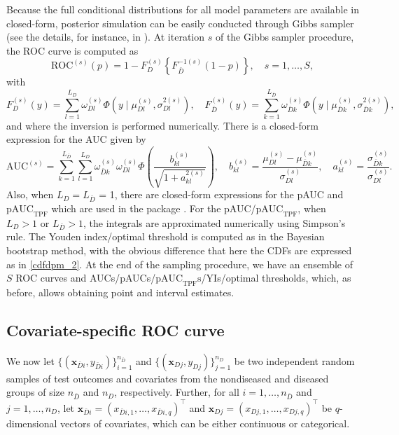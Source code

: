 Because the full conditional distributions for all model parameters are available in closed-form, posterior simulation can be easily conducted through Gibbs sampler (see the details, for instance, in \citealt{Ishwaran2002}). At iteration $s$ of the Gibbs sampler procedure, the ROC curve is computed as
\begin{equation*} 
\text{ROC}^{(s)}(p)=1-F_D^{(s)}\left\{F_{\bar{D}}^{-1(s)}(1-p)\right\},  \quad s=1,\ldots, S,
\end{equation*}
with
\begin{equation} \label{cdfdpm_2} 
F_D^{(s)}(y)=\sum_{l=1}^{L_D}\omega_{Dl}^{(s)}\Phi\left(y\mid\mu_{Dl}^{(s)},\sigma_{Dl}^{2(s)}\right),\quad
F_{\bar{D}}^{(s)}(y)=\sum_{k=1}^{L_{\bar{D}}}\omega_{\bar{D}k}^{(s)}\Phi\left(y\mid\mu_{\bar{D}k}^{(s)},\sigma_{\bar{D}k}^{2(s)}\right),
\end{equation}
and where the inversion is performed numerically. There is a closed-form expression for the AUC \citep{Erkanli2006} given by
\begin{equation*}
\text{AUC}^{(s)}=\sum_{k=1}^{L_{\bar{D}}}\sum_{l=1}^{L_D}\omega_{\bar{D}k}^{(s)}\omega_{Dl}^{(s)}\Phi\left(\frac{b_{kl}^{(s)}}{\sqrt{1+a_{kl}^{2(s)}}}\right),\quad b_{kl}^{(s)}=\frac{\mu_{Dl}^{(s)}-\mu_{\bar{D}k}^{(s)}}{\sigma_{Dl}^{(s)}},\quad a_{kl}^{(s)}=\frac{\sigma_{\bar{D}k}^{(s)}}{\sigma_{Dl}^{(s)}}.
\end{equation*}
Also, when $L_D = L_{\bar{D}}$ = 1, there are closed-form expressions for the pAUC and $\text{pAUC}_{\text{TPF}}$ which are used in the package \citep[see][]{Hillis12}. For the pAUC/$\text{pAUC}_{\text{TPF}}$, when $L_D > 1$ or $L_{\bar{D}} > 1$, the integrals are approximated numerically using Simpson's rule. The Youden index/optimal threshold is computed as in the Bayesian bootstrap method, with the obvious difference that here the CDFs are expressed as in \eqref{cdfdpm_2}. At the end of the sampling procedure, we have an ensemble of $S$ ROC curves and AUCs/pAUCs/$\text{pAUC}_{\text{TPF}}\text{s}$/YIs/optimal thresholds, which, as before, allows obtaining point and interval estimates.

\subsection{Covariate-specific ROC curve}\label{sec:cROC}
We now let $\{(\mathbf{x}_{\bar{D}i},y_{\bar{D}i})\}_{i=1}^{n_{\bar{D}}}$ and $\{(\mathbf{x}_{Dj},y_{Dj})\}_{j=1}^{n_D}$ be two independent random samples of test outcomes and covariates from the nondiseased and diseased groups of size $n_{\bar{D}}$ and $n_D$, respectively. Further, for all $i = 1,\ldots,n_{\bar{D}}$ and $j = 1,\ldots,n_D$, let $\mathbf{x}_{\bar{D}i}=(x_{\bar{D}i,1},\ldots, x_{\bar{D}i,q})^{\top}$ and $\mathbf{x}_{Dj}=(x_{Dj,1},\ldots, x_{Dj,q})^{\top}$ be $q$-dimensional vectors of covariates, which can be either continuous or categorical.

